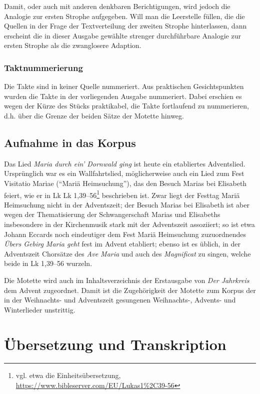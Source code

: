 \documentclass[a4paper]{book}
\begin{document}
\begin{multicols}{2}
Damit, oder auch mit anderen denkbaren Berichtigungen, wird jedoch die
Analogie zur ersten Strophe aufgegeben. Will man die Leerstelle füllen,
die die Quellen in der Frage der Textverteilung der zweiten Strophe
hinterlassen, dann erscheint die in dieser Ausgabe gewählte strenger
durchführbare Analogie zur ersten Strophe als die zwanglosere Adaption.

\subsubsection{Taktnummerierung}

Die Takte sind in keiner Quelle nummeriert. Aus praktischen
Gesichtspunkten wurden die Takte in der vorliegenden Ausgabe nummeriert.
Dabei erschien es wegen der Kürze des Stücks praktikabel, die Takte
fortlaufend zu nummerieren, d.h. über die Grenze der beiden Sätze der
Motette hinweg.

\subsection{Aufnahme in das Korpus}

Das Lied \emph{Maria durch ein' Dornwald ging} ist heute ein etabliertes Adventslied. Ursprünglich war es ein Wallfahrtslied, möglicherweise auch ein Lied zum Fest Visitatio Mariae (\enquote{Mariä Heimsuchung}), das den Besuch Marias bei Elisabeth feiert, wie er in Lk Lk 1,39–56\footnote{vgl. etwa die Einheitsübersetzung, \url{https://www.bibleserver.com/EU/Lukas1\%2C39-56} } beschrieben ist. Zwar liegt der Festtag Mariä Heimsuchung nicht in der Adventszeit; der Besuch Marias bei Elisabeth ist aber wegen der Thematisierung der Schwangerschaft Marias und Elisabeths insbesondere in der Kirchenmusik stark mit der Adventszeit assoziiert; so ist etwa Johann Eccards noch eindeutiger dem Fest Mariä Heimsuchung zuzuordnendes \emph{Übers Gebirg Maria geht} fest im Advent etabliert; ebenso ist es üblich, in der Adventszeit Chorsätze des \emph{Ave Maria} und auch des \emph{Magnificat} zu singen, welche beide in Lk 1,39–56 wurzeln.

Die Motette wird auch im Inhaltsverzeichnis der Erstausgabe von \emph{Der Jahrkreis} dem Advent zugeordnet. Damit ist die Zugehörigkeit der Motette zum Korpus der in der Weihnachts- und Adventszeit gesungenen Weihnachts-, Advents- und Winterlieder unstrittig.

\end{multicols}
\section{Übersetzung und Transkription}
\end{document}
